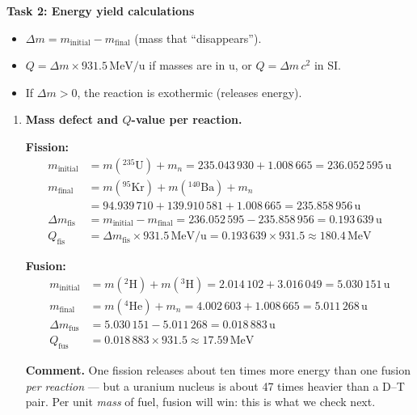 \documentclass[11pt]{article}
\newcommand{\cle}[1]{{\popxbold\color{popdark}#1}}
\begin{document}
\textbf{Task 2: Energy yield calculations}

\begin{aretenir}
\begin{itemize}
    \item $\Delta m = m_{\text{initial}} - m_{\text{final}}$ (mass that ``disappears'').
    \item $Q = \Delta m \times 931.5\,\mathrm{MeV/u}$ if masses are in u, or $Q = \Delta m\, c^2$ in SI.
    \item If $\Delta m > 0$, the reaction is \cle{exothermic} (releases energy).
\end{itemize}
\end{aretenir}

\begin{enumerate}
    \item \textbf{Mass defect and $Q$-value per reaction.}

    \textbf{Fission:}
    \begin{align*}
        m_{\text{initial}} &= m(^{235}\mathrm{U}) + m_n = 235.043\,930 + 1.008\,665 = 236.052\,595\,\mathrm{u} \\
        m_{\text{final}} &= m(^{95}\mathrm{Kr}) + m(^{140}\mathrm{Ba}) + m_n \\
        &= 94.939\,710 + 139.910\,581 + 1.008\,665 = 235.858\,956\,\mathrm{u} \\
        \Delta m_{\text{fis}} &= m_{\text{initial}} - m_{\text{final}} = 236.052\,595 - 235.858\,956 = 0.193\,639\,\mathrm{u} \\
        Q_{\text{fis}} &= \Delta m_{\text{fis}} \times 931.5\,\mathrm{MeV/u} = 0.193\,639 \times 931.5 \approx \boxed{180.4\,\mathrm{MeV}}
    \end{align*}

    \textbf{Fusion:}
    \begin{align*}
        m_{\text{initial}} &= m(^{2}\mathrm{H}) + m(^{3}\mathrm{H}) = 2.014\,102 + 3.016\,049 = 5.030\,151\,\mathrm{u} \\
        m_{\text{final}} &= m(^{4}\mathrm{He}) + m_n = 4.002\,603 + 1.008\,665 = 5.011\,268\,\mathrm{u} \\
        \Delta m_{\text{fus}} &= 5.030\,151 - 5.011\,268 = 0.018\,883\,\mathrm{u} \\
        Q_{\text{fus}} &= 0.018\,883 \times 931.5 \approx \boxed{17.59\,\mathrm{MeV}}
    \end{align*}

    \textbf{Comment.} One fission releases about ten times more energy than one fusion \emph{per reaction} — but a uranium nucleus is about 47 times heavier than a D--T pair. Per unit \emph{mass} of fuel, fusion will win: this is what we check next.


\end{enumerate}
\end{document}
